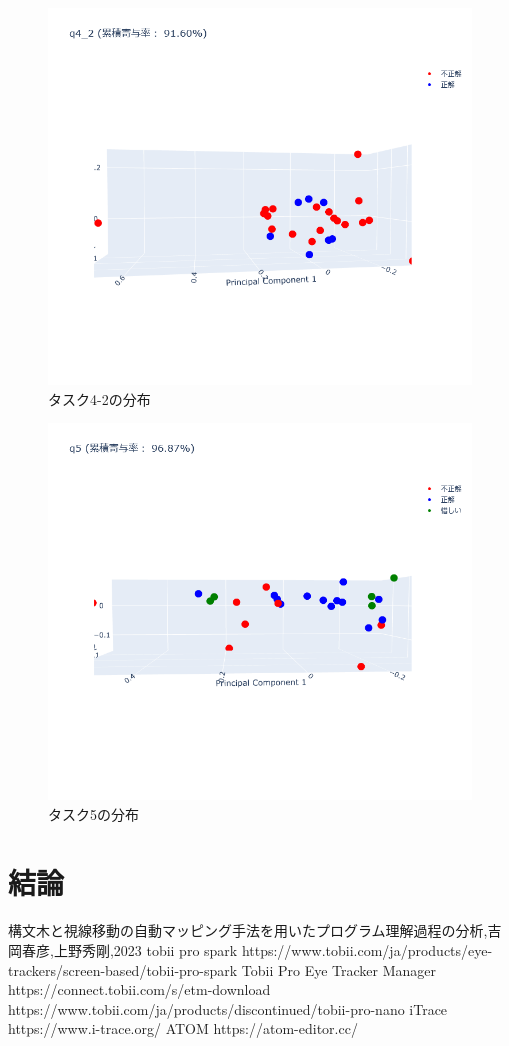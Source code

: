 \documentclass[paper=a4paper,fontsize=10pt]{jlreq}
\begin{document}
    \begin{figure}[htbp]
      \centering
      \includegraphics[width=0.8\linewidth]{3dplot_q4_2.png}
      \caption{タスク4-2の分布}
    \end{figure}
    \FloatBarrier
    \begin{figure}[htbp]
      \centering
      \includegraphics[width=0.8\linewidth]{3dplot_q5.png}
      \caption{タスク5の分布}
    \end{figure}
    \FloatBarrier

\clearpage    

\part{結論}


\begin{thebibliography}{99}
   構文木と視線移動の自動マッピング手法を用いたプログラム理解過程の分析,吉岡春彦,上野秀剛,2023
   tobii pro spark https://www.tobii.com/ja/products/eye-trackers/screen-based/tobii-pro-spark
   Tobii Pro Eye Tracker Manager https://connect.tobii.com/s/etm-download
   https://www.tobii.com/ja/products/discontinued/tobii-pro-nano
   iTrace https://www.i-trace.org/
   ATOM https://atom-editor.cc/
\end{thebibliography}
\end{document}
